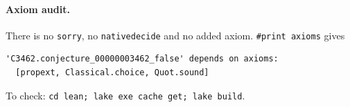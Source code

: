 \documentclass[11pt]{article}
\theoremstyle{definition}
\theoremstyle{remark}
\renewcommand{\_}{\oldus\allowbreak}
\begin{document}
\paragraph{Axiom audit.} There is no \texttt{sorry}, no \texttt{native\_decide} and no added axiom.
\texttt{\#print axioms} gives
\begin{verbatim}
'C3462.conjecture_00000003462_false' depends on axioms:
  [propext, Classical.choice, Quot.sound]
\end{verbatim}
To check: \texttt{cd lean; lake exe cache get; lake build}.
\end{document}
